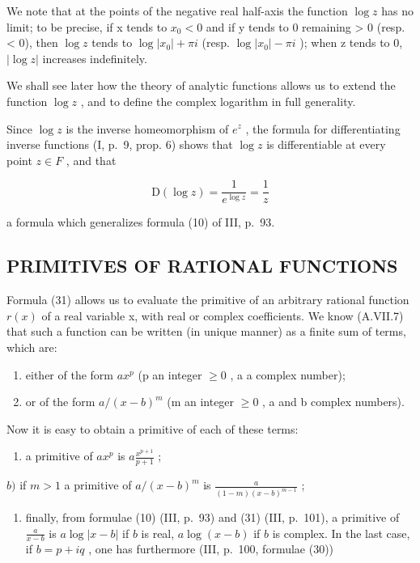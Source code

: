 We note that at the points of the negative real half-axis the function \(\log z\) has no limit; to be precise, if x tends to \(x_{0} < 0\) and if y tends to 0 remaining \textgreater{} 0 (resp. \textless{} 0), then \(\log z\) tends to \(\log |x_{0}| + \pi i\) (resp. \(\log |x_{0}| - \pi i\) ); when z tends to 0, \(|\log z|\) increases indefinitely.

We shall see later how the theory of analytic functions allows us to extend the function \(\log z\) , and to define the complex logarithm in full generality.

Since \(\log z\) is the inverse homeomorphism of \(e^{z}\) , the formula for differentiating inverse functions (I, p.~9, prop. 6) shows that \(\log z\) is differentiable at every point \(z \in F\) , and that

\[
\mathrm{D} (\log z) = \frac {1}{e ^ {\log z}} = \frac {1}{z}\tag{31}
\]

a formula which generalizes formula (10) of III, p.~93.

\subsection{PRIMITIVES OF RATIONAL FUNCTIONS}

Formula (31) allows us to evaluate the primitive of an arbitrary rational function \(r(x)\) of a real variable x, with real or complex coefficients. We know (A.VII.7) that such a function can be written (in unique manner) as a finite sum of terms, which are:

\begin{enumerate}
\def\labelenumi{\alph{enumi})}
\item
  either of the form \(ax^{p}\) (p an integer \(\geqslant 0\) , a a complex number);
\item
  or of the form \(a/(x - b)^{m}\) (m an integer \(\geqslant 0\) , a and b complex numbers).
\end{enumerate}

Now it is easy to obtain a primitive of each of these terms:

\begin{enumerate}
\def\labelenumi{\alph{enumi})}
\tightlist
\item
  a primitive of \(ax^p\) is \(a\frac{x^{p + 1}}{p + 1}\) ;
\end{enumerate}

\(b)\) if \(m > 1\) a primitive of \(a / (x - b)^{m}\) is \(\frac{a}{(1 - m)(x - b)^{m - 1}}\) ;

\begin{enumerate}
\def\labelenumi{\alph{enumi})}
\setcounter{enumi}{2}
\tightlist
\item
  finally, from formulae (10) (III, p.~93) and (31) (III, p.~101), a primitive of \(\frac{a}{x - b}\) is \(a\log |x - b|\) if \(b\) is real, \(a\log (x - b)\) if \(b\) is complex. In the last case, if \(b = p + iq\) , one has furthermore (III, p.~100, formulae (30))
\end{enumerate}

